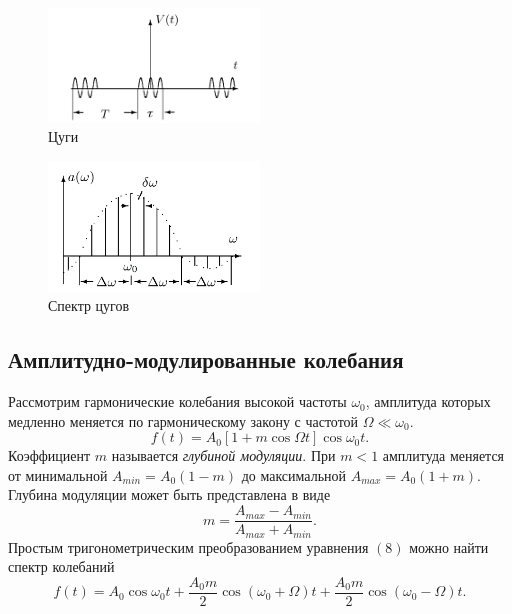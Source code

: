 \documentclass[a4paper, 12pt]{article}
\begin{document}
\begin{figure}[H]
    \centering
    \includegraphics[width=0.5\textwidth]{data/zug.png}
    \caption{Цуги}
    \label{fig:data/zug.png}
\end{figure}
\begin{figure}[H]
    \centering
    \includegraphics[width=0.5\textwidth]{data/spzug.png}
    \caption{Спектр цугов}
    \label{fig:data/spzug.png}
\end{figure}
\subsection*{Амплитудно-модулированные колебания}
Рассмотрим гармонические колебания высокой частоты $\omega_0$, амплитуда которых медленно меняется по гармоническому закону с частотой $\Omega \ll \omega_0$.
\begin{equation}
f(t) = A_0 \left[1+m\cos \Omega t\right] \cos \omega_0 t.
\end{equation}
Коэффициент $m$ называется \textit{глубиной модуляции}. При $m < 1$ амплитуда меняется от минимальной $A_{min} = A_0(1-m)$ до максимальной $A_{max} = A_0(1+m)$. Глубина модуляции может быть представлена в виде
\begin{equation}
m = \dfrac{A_{max}-A_{min}}{A_{max}+A_{min}}.
\end{equation}
Простым тригонометрическим преобразованием уравнения $(8)$ можно найти спектр колебаний
\begin{equation}
f(t) = A_0 \cos \omega_0t + \dfrac{A_0m}{2} \cos \left(\omega_0 + \Omega\right)t + \dfrac{A_0m}{2}\cos\left(\omega_0 - \Omega\right)t.
\end{equation}
\end{document}
